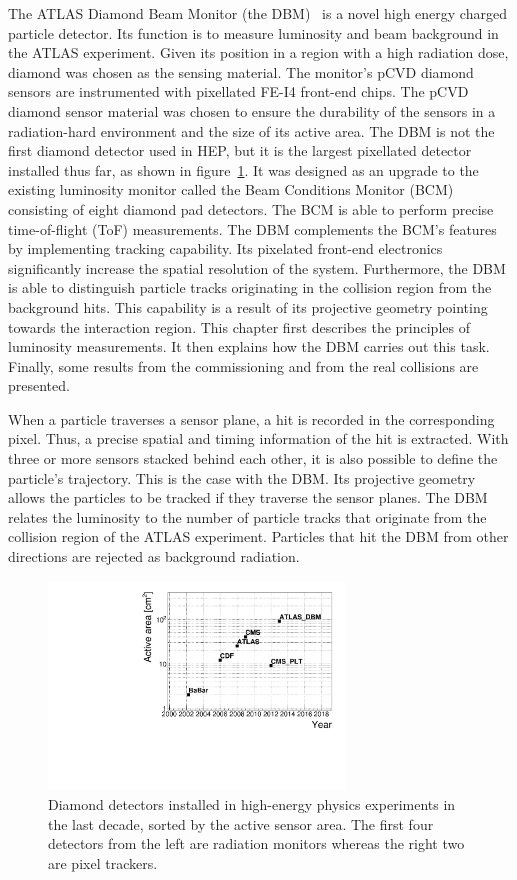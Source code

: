 The ATLAS Diamond Beam Monitor (the DBM)~\cite{Cerv:1630832} is a novel high energy charged particle detector. Its function is to measure luminosity and beam background in the ATLAS experiment. Given its position in a region with a high radiation dose, diamond was chosen as the sensing material. The monitor's pCVD diamond sensors are instrumented with pixellated FE-I4 front-end chips. The pCVD diamond sensor material was chosen to ensure the durability of the sensors in a radiation-hard environment and the size of its active area. The DBM is not the first diamond detector used in HEP, but it is the largest pixellated detector installed thus far, as shown in figure~\ref{fig:areavsyear}. It was designed as an upgrade to the existing luminosity monitor called the Beam Conditions Monitor (BCM)~\cite{Gorisek:1062633} consisting of eight diamond pad detectors. The BCM is able to perform precise time-of-flight (ToF) measurements. The DBM complements the BCM's features by implementing tracking capability. Its pixelated front-end electronics significantly increase the spatial resolution of the system. Furthermore, the DBM is able to distinguish particle tracks originating in the collision region from the background hits. This capability is a result of its projective geometry pointing towards the interaction region. This chapter first describes the principles of luminosity measurements. It then explains how the DBM carries out this task. Finally, some results from the commissioning and from the real collisions are presented. 

When a particle traverses a sensor plane, a hit is recorded in the corresponding pixel. Thus, a precise spatial and timing information of the hit is extracted. With three or more sensors stacked behind each other, it is also possible to define the particle's trajectory. This is the case with the DBM. Its projective geometry allows the particles to be tracked if they traverse the sensor planes. The DBM relates the luminosity to the number of particle tracks that originate from the collision region of the ATLAS experiment. Particles that hit the DBM from other directions are rejected as background radiation.

\begin{figure}[!t]
\centering
\includegraphics[width=0.7\textwidth]{../scripts/04_charge_monitoring/plots/detArea}
\caption{Diamond detectors installed in high-energy physics experiments in the last decade, sorted by the active sensor area. The first four detectors from the left are radiation monitors whereas the right two are pixel trackers.}
\label{fig:areavsyear}
\end{figure}

